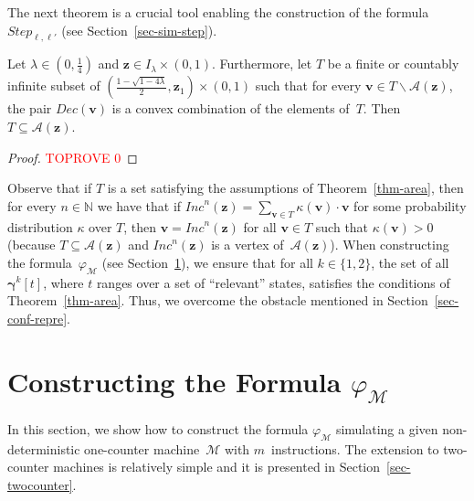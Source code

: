 \documentclass[a4paper,UKenglish,cleveref, autoref, thm-restate]{lipics-v2021}
\newcommand{\N}{\mathbb{N}}
\newcommand{\M}{\mathcal{M}}
\newcommand{\Step}{\mathit{Step}}
\newcommand{\Area}{\mathcal{A}}
\newcommand{\INC}{\mathit{Inc}}
\newcommand{\DEC}{\mathit{Dec}}
\renewcommand{\vec}[1]{\pmb{#1}}
\newcommand{\cv}{\vec{\gamma}}
\begin{document}
The next theorem is a crucial tool enabling the construction of the formula $\Step_{\ell,\ell'}$ (see Section~\ref{sec-sim-step}). 

\begin{theorem}
    \label{thm-area}
    Let $\lambda \in (0,\frac{1}{4})$ and $\vec{z} \in I_\lambda \times (0,1)$.
    Furthermore, let $T$ be a finite or countably infinite subset of $(\frac{1-\sqrt{1-4\lambda}}{2},\vec{z}_1) \times (0,1)$ such that for every $\vec{v} \in T \smallsetminus \Area(\vec{z})$, the pair $\DEC(\vec{v})$ is a convex combination of the elements of~$T$. Then $T \subseteq \Area(\vec{z})$.
\end{theorem}
\begin{proof}\textcolor{red}{TOPROVE 0}\end{proof}

Observe that if $T$ is a set satisfying the assumptions of Theorem~\ref{thm-area}, then for every $n \in \N$ we have that if $\INC^n(\vec{z}) = \sum_{\vec{v} \in T} \kappa(\vec{v}) \cdot \vec{v}$ for some probability distribution $\kappa$ over $T$, then $\vec{v} = \INC^n(\vec{z})$ for all $\vec{v} \in T$ such that $\kappa(\vec{v}) > 0$ (because $T \subseteq \Area(\vec{z})$ and $\INC^n(\vec{z})$ is a vertex of~$\Area(\vec{z})$). When constructing the formula~$\varphi_\M$ (see Section~\ref{sec-formula}), we ensure that for all $k \in \{1,2\}$, the set of all $\cv^k[t]$, where $t$ ranges over a set of ``relevant'' states, satisfies the conditions of Theorem~\ref{thm-area}. Thus, we overcome the obstacle mentioned in Section~\ref{sec-conf-repre}.
 \section{Constructing the Formula $\varphi_\M$}
\label{sec-formula}

In this section, we show how to construct the formula $\varphi_\M$ simulating a given non-deterministic one-counter machine~$\M$ with $m$~instructions. The extension to two-counter machines is relatively simple and it is presented in Section~\ref{sec-twocounter}. 
\end{document}
